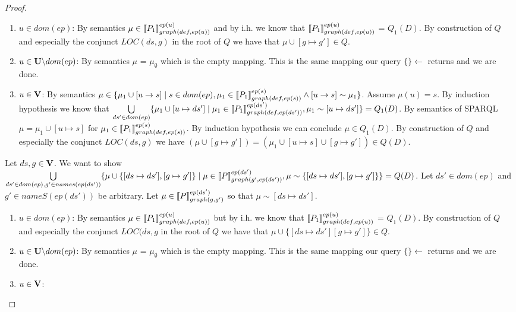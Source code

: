 \begin{proof}
\begin{enumerate}
			\begin{enumerate}
				\item  $u \in dom(ep)$:
					By semantics $\mu \in \llbracket P_1
					\rrbracket^{ep(u)}_{graph(def,ep(u))}$
					and by i.h. we know that $\llbracket P_1 \rrbracket^{ep(u)}_{graph(def,ep(u))}$ =	$Q_1(D)$.
					By construction of $Q$ and especially the conjunct
					$LOC(ds,g)$ in the root of $Q$ we have that $\mu\cup[g \mapsto g'] \in Q$.
				\item $u \in \mathbf{U}\backslash dom(ep)$:
					By semantics $\mu$ = $\mu_\emptyset$ which is the empty
					mapping. This is the same mapping our query
					$\{\} \leftarrow$ returns and we are
					done.
				\item $u \in \mathbf{V}$:
					By semantics $\mu \in \{ \mu_1 \cup [u \rightarrow s ] \mid
						s \in dom(ep), \mu_1 \in \llbracket P_1
						\rrbracket^{ep(s)}_{graph(def,ep(s))} \land
					[u \rightarrow s] \sim \mu_1 \}$. Assume $\mu(u) = s$.
					By induction hypothesis we know that 
					$\bigcup\limits_{ds' \in dom(ep)} \{ \mu_1 \cup [u
						\mapsto ds'] \mid \mu_1 \in
						\llbracket P_1\rrbracket^{ep(ds')}_{graph(def,ep(ds'))},
					\mu_1 \sim [u\mapsto ds'] \} = Q_1(D) $.
					By semantics of SPARQL $\mu = \mu_1 \cup
					[u \mapsto s]$ for  $\mu_1 \in \llbracket
					P_1\rrbracket^{ep(s)}_{graph(def,ep(s))}$. 
					By induction hypothesis we can conclude
					$\mu \in Q_1(D)$.
					By construction of $Q$ and especially the conjunct
					$LOC(ds,g)$ we have $(\mu \cup [g \mapsto g']) = (\mu_1 \cup [u \mapsto s] 
					\cup [g	\mapsto g']) \in Q(D)$. 
			\end{enumerate}

			\bigskip\noindent
			Let $ds,g \in \mathbf{V}$.
			We want to show  	
			$\bigcup\limits_{ds' \in dom(ep), g' \in names(ep(ds'))} \{ \mu \cup
				\{[ds \mapsto ds'],[g \mapsto g']\} \mid \mu \in
				\llbracket P\rrbracket^{ep(ds')}_{graph(g',ep(ds'))}, 
				\mu \sim
			\{[ds \mapsto ds'], [g \mapsto g']\}\} = Q(D)$.
			Let $ds' \in dom(ep)$ and $g' \in nameS(ep(ds'))$ be arbitrary.
			Let $\mu \in \llbracket P \rrbracket^{ep(ds')}_{graph(g,g')}$ so that $\mu \sim
			[ds\mapsto ds']$.
			\begin{enumerate}
				\item  $u \in dom(ep)$:
					By semantics $\mu \in \llbracket P_1
					\rrbracket^{ep(u)}_{graph(def,ep(u))}$
					but by i.h. we know that 
					$\llbracket P_1 \rrbracket^{ep(u)}_{graph(def,ep(u))}$ =
					$Q_1(D)$.
					By construction of $Q$ and especially the conjunct
					$LOC(ds,g$ in the root of $Q$ we
					have that $\mu\cup \{[ds \mapsto ds'][g \mapsto g']\} \in Q$.
				\item $u \in \mathbf{U}\backslash dom(ep)$:
					By semantics $\mu$ = $\mu_\emptyset$ which is the empty
					mapping. This is the same mapping our query
					$\{\} \leftarrow$ returns and we are
					done.
				\item $u \in \mathbf{V}$:
					

\end{enumerate}
\end{enumerate}
\end{proof}
